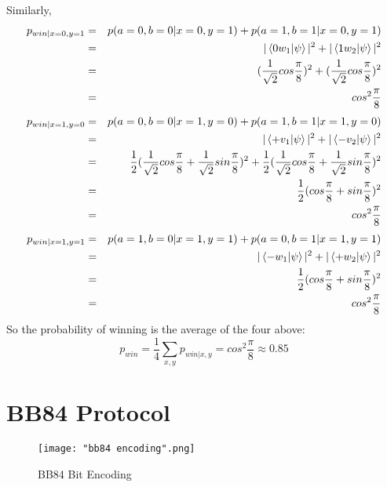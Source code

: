 Similarly,
\begin{eqnarray*}
p_{win|x=0,y=1}&=&p(a=0, b=0|x=0, y=1)+p(a=1, b=1|x=0, y=1)\\
&=&|\braket{0 w_1|\psi}|^2 + |\braket{1 w_2|\psi}|^2\\
&=&(\frac{1}{\sqrt{2}}cos\frac{\pi}{8})^2+(\frac{1}{\sqrt{2}}cos\frac{\pi}{8})^2\\
&=&cos^2 \frac{\pi}{8}
\end{eqnarray*}
\begin{eqnarray*}
p_{win|x=1,y=0}&=&p(a=0, b=0|x=1, y=0)+p(a=1, b=1|x=1, y=0)\\
&=&|\braket{+ v_1|\psi}|^2 + |\braket{- v_2|\psi}|^2\\
&=&\frac{1}{2}(\frac{1}{\sqrt{2}}cos\frac{\pi}{8}+\frac{1}{\sqrt{2}}sin\frac{\pi}{8})^2+\frac{1}{2}(\frac{1}{\sqrt{2}}cos\frac{\pi}{8}+\frac{1}{\sqrt{2}}sin\frac{\pi}{8})^2\\
&=&\frac{1}{2}(cos\frac{\pi}{8}+sin\frac{\pi}{8})^2\\
&=&cos^2 \frac{\pi}{8}
\end{eqnarray*}
\begin{eqnarray*}
p_{win|x=1,y=1}&=&p(a=1, b=0|x=1, y=1)+p(a=0, b=1|x=1, y=1)\\
&=&|\braket{- w_1|\psi}|^2 + |\braket{+ w_2|\psi}|^2\\
&=&\frac{1}{2}(cos\frac{\pi}{8}+sin\frac{\pi}{8})^2\\
&=&cos^2 \frac{\pi}{8}
\end{eqnarray*}
So the probability of winning is the average of the four above:
\begin{equation*}
    p_{win}=\frac{1}{4}\sum_{x,y}p_{win|x,y}=cos^2 \frac{\pi}{8} \approx 0.85
\end{equation*}

\pagebreak

\section{BB84 Protocol}

\begin{figure}[h]
    \centering
    \texttt{[image: "bb84 encoding".png]}
    \caption{BB84 Bit Encoding \protect\footnotemark}
    \label{fig:BB84 bit encoding}
\end{figure}

